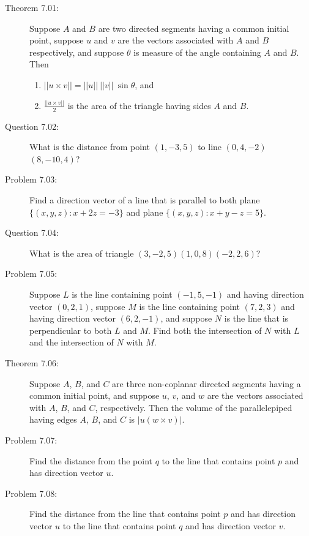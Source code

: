 \documentclass{article}
\begin{document}
\begin{description}

  \item[Theorem 7.01:] Suppose $A$ and $B$ are two directed segments having a common initial point, suppose $u$ and $v$ are the vectors associated with $A$ and $B$ respectively, and suppose $\theta$ is measure of the angle containing $A$ and $B$. Then
    \begin{enumerate}[\hspace{1cm}(a)]
      \item $\vert \vert u \times v \vert \vert = \vert \vert u \vert \vert \  \vert \vert v \vert \vert \ \sin \theta$, and
      \item $\frac{ \vert \vert u \times v \vert \vert }{2}$ is the area of the triangle having sides $A$ and $B$.
    \end{enumerate}

  \item[Question 7.02:] What is the distance from point $(1, -3, 5)$ to line $(0, 4, -2)$ $(8, -10, 4)$?

  \item[Problem 7.03:] Find a direction vector of a line that is parallel to both plane $\{ (x,y,z): x+2z = -3 \}$ and plane $\{ (x,y,z): x+y-z = 5 \}$.

  \item[Question 7.04:] What is the area of triangle $(3, -2, 5) (1, 0, 8) (-2, 2, 6)$?

  \item[Problem 7.05:] Suppose $L$ is the line containing point $(-1, 5, -1)$ and having direction vector $(0, 2, 1)$, suppose $M$ is the line containing point $(7, 2, 3)$ and having direction vector $(6, 2, -1)$, and suppose $N$ is the line that is perpendicular to both $L$ and $M$. Find both the intersection of $N$ with $L$ and the intersection of $N$ with $M$.

  \item[Theorem 7.06:] Suppose $A$, $B$, and $C$ are three non-coplanar directed segments having a common initial point, and suppose $u$, $v$, and $w$ are the vectors associated with $A$, $B$, and $C$, respectively. Then the volume of the parallelepiped having edges $A$, $B$, and $C$ is $\vert u(w \times v) \vert$.

  \item[Problem 7.07:] Find the distance from the point $q$ to the line that contains point $p$ and has direction vector $u$.

  \item[Problem 7.08:] Find the distance from the line that contains point $p$ and has direction vector $u$ to the line that contains point $q$ and has direction vector $v$.

\end{description}
\end{document}
